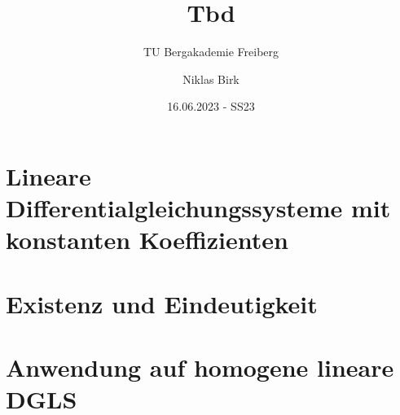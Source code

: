 \documentclass[11pt]{scrartcl}
\title{
    Tbd
}
\subtitle{TU Bergakademie Freiberg}
\author{Niklas Birk}
\date{16.06.2023 - SS23}
\begin{document}
    \maketitle
    \tableofcontents

    \printbibliography

    \newpage

    \section{Lineare Differentialgleichungssysteme mit konstanten Koeffizienten}\label{sec:01}
    

    \section{Existenz und Eindeutigkeit}\label{sec:02}
    

    \section{Anwendung auf homogene lineare DGLS}\label{sec:03}
    
\end{document}
